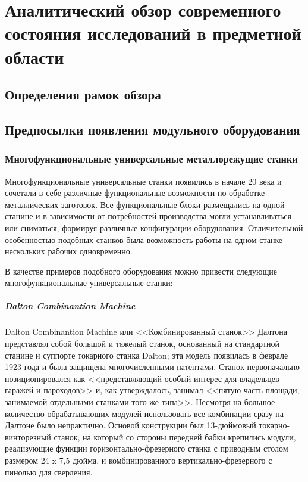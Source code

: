 \chapter{Аналитический обзор современного состояния исследований в предметной области}\label{ch:ch1}

\section{Определения рамок обзора}\label{sec:ch1/sec1}

\section{Предпосылки появления модульного оборудования}

\subsection{Многофункциональные универсальные металлорежущие станки}

Многофункциональные универсальные станки появились в начале 20 века и сочетали в себе различные функциональные возможности по обработке металлических заготовок. Все функциональные блоки размещались на одной станине и в зависимости от потребностей производства могли устанавливаться или сниматься, формируя различные конфигурации оборудования. Отличительной особенностью подобных станков была возможность работы на одном станке нескольких рабочих одновременно.

В качестве примеров подобного оборудования можно привести следующие многофункциональные универсальные станки:

\paragraph{Dalton Combinantion Machine}

Dalton Combinantion Machine или <<Комбинированный станок>> Далтона представлял собой большой и тяжелый станок, основанный на стандартной станине и суппорте токарного станка Dalton; эта модель появилась в феврале 1923 года и была защищена многочисленными патентами. Станок первоначально позиционировался как <<представляющий особый интерес для владельцев гаражей и пароходов>> и, как утверждалось, занимал <<пятую часть площади, занимаемой отдельными станками того же типа>>. Несмотря на большое количество обрабатывающих модулей использовать все комбинации сразу на Далтоне было непрактично. Основой конструкции был 13-дюймовый токарно-винторезный станок, на который со стороны передней бабки крепились модули, реализующие функции горизонтально-фрезерного станка с приводным столом размером 24 x 7,5 дюйма, и комбинированного вертикально-фрезерного с пинолью для сверления. 

